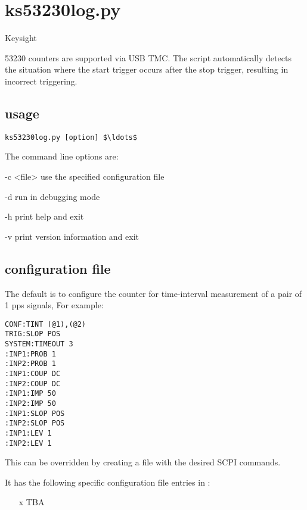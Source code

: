 \section{ks53230log.py}

\hypertarget{h:ks53230log}{Keysight} 53230 counters are supported via USB TMC.
The script automatically detects the situation where the start trigger occurs after the stop trigger,
resulting in incorrect triggering. 

\subsection{usage}

\begin{lstlisting}[mathescape=true]
ks53230log.py [option] $\ldots$ 
\end{lstlisting}

The command line options are:
\begin{description*}
	\item[-c \textless file\textgreater] use the specified configuration file
	\item[-d]	run in debugging mode
	\item[-h]	print help and exit
	\item[-v]	print version information and exit
\end{description*}

\subsection{configuration file}

The default is to configure the counter for time-interval measurement of a pair of 1 pps signals,
For example:
\begin{lstlisting}
CONF:TINT (@1),(@2)             
TRIG:SLOP POS
SYSTEM:TIMEOUT 3
:INP1:PROB 1                    
:INP2:PROB 1                   
:INP1:COUP DC                   
:INP2:COUP DC                   
:INP1:IMP 50                   
:INP2:IMP 50                    
:INP1:SLOP POS
:INP2:SLOP POS
:INP1:LEV 1
:INP2:LEV 1
\end{lstlisting}

This can be overridden by creating a file with the desired SCPI commands.


It has the following specific configuration file entries in :
\begin{itemize}
\item[x] TBA
\end{itemize}

